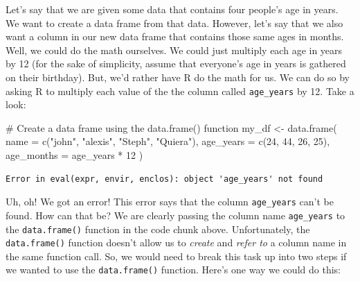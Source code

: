 \documentclass[
  letterpaper,
  DIV=11,
  numbers=noendperiod]{scrreprt}
\newenvironment{Shaded}{\begin{snugshade}}{\end{snugshade}}
\newcommand{\AttributeTok}[1]{\textcolor[rgb]{0.40,0.45,0.13}{#1}}
\newcommand{\CommentTok}[1]{\textcolor[rgb]{0.37,0.37,0.37}{#1}}
\newcommand{\DecValTok}[1]{\textcolor[rgb]{0.68,0.00,0.00}{#1}}
\newcommand{\FunctionTok}[1]{\textcolor[rgb]{0.28,0.35,0.67}{#1}}
\newcommand{\NormalTok}[1]{\textcolor[rgb]{0.00,0.23,0.31}{#1}}
\newcommand{\OtherTok}[1]{\textcolor[rgb]{0.00,0.23,0.31}{#1}}
\newcommand{\SpecialCharTok}[1]{\textcolor[rgb]{0.37,0.37,0.37}{#1}}
\newcommand{\StringTok}[1]{\textcolor[rgb]{0.13,0.47,0.30}{#1}}
\begin{document}
Let's say that we are given some data that contains four people's age in
years. We want to create a data frame from that data. However, let's say
that we also want a column in our new data frame that contains those
same ages in months. Well, we could do the math ourselves. We could just
multiply each age in years by 12 (for the sake of simplicity, assume
that everyone's age in years is gathered on their birthday). But, we'd
rather have R do the math for us. We can do so by asking R to multiply
each value of the the column called \texttt{age\_years} by 12. Take a
look:

\begin{Shaded}
\begin{Highlighting}[]
\CommentTok{\# Create a data frame using the data.frame() function}
\NormalTok{my\_df }\OtherTok{\textless{}{-}} \FunctionTok{data.frame}\NormalTok{(}
  \AttributeTok{name       =} \FunctionTok{c}\NormalTok{(}\StringTok{"john"}\NormalTok{, }\StringTok{"alexis"}\NormalTok{, }\StringTok{"Steph"}\NormalTok{, }\StringTok{"Quiera"}\NormalTok{),}
  \AttributeTok{age\_years  =} \FunctionTok{c}\NormalTok{(}\DecValTok{24}\NormalTok{, }\DecValTok{44}\NormalTok{, }\DecValTok{26}\NormalTok{, }\DecValTok{25}\NormalTok{),}
  \AttributeTok{age\_months =}\NormalTok{ age\_years }\SpecialCharTok{*} \DecValTok{12}
\NormalTok{)}
\end{Highlighting}
\end{Shaded}

\begin{verbatim}
Error in eval(expr, envir, enclos): object 'age_years' not found
\end{verbatim}

Uh, oh! We got an error! This error says that the column
\texttt{age\_years} can't be found. How can that be? We are clearly
passing the column name \texttt{age\_years} to the \texttt{data.frame()}
function in the code chunk above. Unfortunately, the
\texttt{data.frame()} function doesn't allow us to \emph{create} and
\emph{refer to} a column name in the same function call. So, we would
need to break this task up into two steps if we wanted to use the
\texttt{data.frame()} function. Here's one way we could do this:
\end{document}
